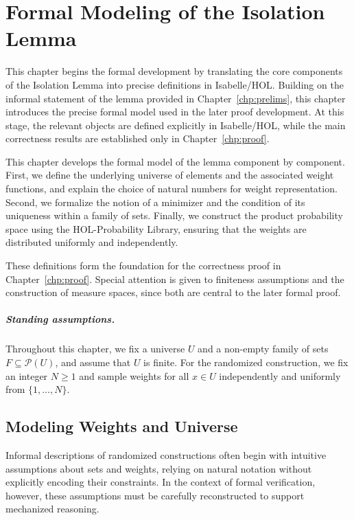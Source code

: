 \chapter{Formal Modeling of the Isolation Lemma}
\label{chp:modeling}

This chapter begins the formal development by translating the core components of the Isolation Lemma into precise definitions in Isabelle/HOL.
Building on the informal statement of the lemma provided in Chapter~\ref{chp:prelims}, this chapter introduces the precise formal model used in the later proof development.
At this stage, the relevant objects are defined explicitly in Isabelle/HOL, while the main correctness results are established only in Chapter~\ref{chp:proof}.

This chapter develops the formal model of the lemma component by component.
First, we define the underlying universe of elements and the associated weight functions, and explain the choice of natural numbers for weight representation.
Second, we formalize the notion of a minimizer and the condition of its uniqueness within a family of sets.
Finally, we construct the product probability space using the HOL-Probability Library, ensuring that the weights are distributed uniformly and independently.

These definitions form the foundation for the correctness proof in Chapter~\ref{chp:proof}.
Special attention is given to finiteness assumptions and the construction of measure spaces, since both are central to the later formal proof.

\paragraph{Standing assumptions.}
Throughout this chapter, we fix a universe $U$ and a non-empty family of sets $F \subseteq \mathcal{P}(U)$, and assume that $U$ is finite.
For the randomized construction, we fix an integer $N \ge 1$ and sample weights for all $x \in U$ independently and uniformly from $\{1, \dots, N\}$.

\section{Modeling Weights and Universe}
\label{sec:modeling_weights}

Informal descriptions of randomized constructions often begin with intuitive assumptions about sets and weights, relying on natural notation without explicitly encoding their constraints.
In the context of formal verification, however, these assumptions must be carefully reconstructed to support mechanized reasoning.

